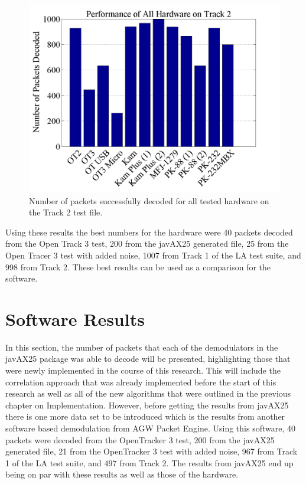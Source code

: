  \begin{figure}
  \centering
	\includegraphics[width=0.75\linewidth]{images/PerformanceofAllHardwareonTrack2.png} 
	\caption{Number of packets successfully decoded for all tested hardware on the Track 2 test file.}
   \label{allHardwareTrack2}
\end{figure}

Using these results the best numbers for the hardware were 40 packets decoded from the Open Track 3 test, 200 from the javAX25 generated file, 25 from the Open Tracer 3 test with added noise, 1007 from Track 1 of the LA test suite, and 998 from Track 2. These best results can be used as a comparison for the software.

\section{Software Results}
In this section, the number of packets that each of the demodulators in the javAX25 package was able to decode will be presented, highlighting those that were newly implemented in the course of this research. This will include the correlation approach that was already implemented before the start of this research as well as all of the new algorithms that were outlined in the previous chapter on Implementation. However, before getting the results from javAX25 there is one more data set to be introduced which is the results from another software based demodulation from AGW Packet Engine. Using this software, 40 packets were decoded from the OpenTracker 3 test, 200 from the javAX25 generated file, 21 from the OpenTracker 3 test with added noise, 967 from Track 1 of the LA test suite, and 497 from Track 2. The results from javAX25 end up being on par with these results as well as those of the hardware.

